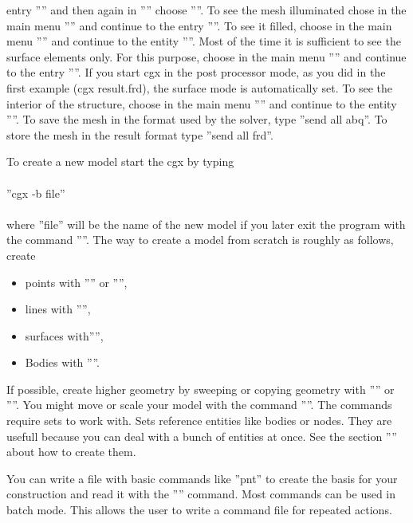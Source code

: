 \documentclass{article}
\begin{document}
entry '''' and then again in '''' choose ''''. To see the mesh illuminated chose in the main menu '''' and continue to the entry ''''. To see it filled, choose in the main menu '''' and continue to the entity ''''. Most of the time it is sufficient to see the surface elements only. For this purpose, choose in the main menu '''' and continue to the entry ''''. If you start cgx in the post processor mode, as you did in the first example (cgx result.frd), the surface mode is automatically set. To see the interior of the structure, choose in the main menu '''' and continue to the entity ''''. To save the mesh in the format used by the solver, type ''send all abq''. To store the mesh in the result format type ''send all frd''. 

To create a new model start the cgx by typing\\\\  ''cgx -b file''\\\\where ''file'' will be the name of the new model if you later exit the program with the command ''''. The way to create a model from scratch is roughly as follows, create
\begin{itemize}
\item points with '''' or '''',
\item lines with '''',
\item surfaces with'''',
\item Bodies with ''''.
\end{itemize}
If possible, create higher geometry by sweeping or copying geometry with '''' or ''''. You might move or scale your model with the command ''''. The commands require sets to work with. Sets reference entities like bodies or nodes. They are usefull because you can deal with a bunch of entities at once. See the section '''' about how to create them.

You can write a file with basic commands like ''pnt'' to create the basis for your construction and read it with the '''' command. Most commands can be used in batch mode. This allows the user to write a command file for repeated actions.
\end{document}
